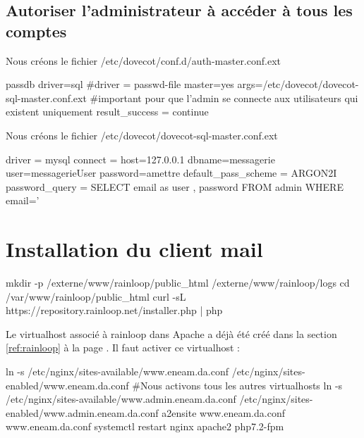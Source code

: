 \documentclass[a4paper,12pt,french]{report} %
\begin{document}
\subsection*{Autoriser l'administrateur à accéder à tous les comptes}
Nous créons le fichier /etc/dovecot/conf.d/auth-master.conf.ext 
\begin{exempleConsole}
passdb {
  driver=sql
  #driver = passwd-file
  master=yes
  args=/etc/dovecot/dovecot-sql-master.conf.ext
  #important pour que l'admin se connecte aux utilisateurs qui existent uniquement
  result_success = continue
}
\end{exempleConsole}

Nous créons le fichier /etc/dovecot/dovecot-sql-master.conf.ext 
\begin{exempleConsole}
driver = mysql
connect = host=127.0.0.1 dbname=messagerie user=messagerieUser password=amettre	
default_pass_scheme = ARGON2I
password_query = SELECT email as user , password FROM admin WHERE email='%
\end{exempleConsole}

\section{Installation du client mail}
\begin{exempleConsole}
mkdir -p /externe/www/rainloop/public_html /externe/www/rainloop/logs 
cd /var/www/rainloop/public_html 
curl -sL https://repository.rainloop.net/installer.php | php
\end{exempleConsole}

Le virtualhost associé à rainloop dans Apache a déjà été créé dans la section \ref{ref:rainloop} à la page \pageref{ref:rainloop}. 
Il faut activer ce virtualhost :
\begin{exempleConsole}
ln -s /etc/nginx/sites-available/www.eneam.da.conf /etc/nginx/sites-enabled/www.eneam.da.conf
#Nous activons tous les autres virtualhosts
ln -s /etc/nginx/sites-available/www.admin.eneam.da.conf /etc/nginx/sites-enabled/www.admin.eneam.da.conf
a2ensite www.eneam.da.conf www.eneam.da.conf
systemctl restart nginx apache2 php7.2-fpm 
\end{exempleConsole}
\end{document}
